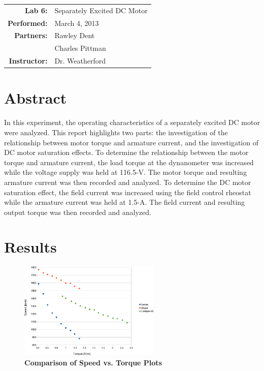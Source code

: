 \documentclass{article}
\begin{document}
\begin{tabular}{rl}
  \textbf{Lab 6:} & Separately Excited DC Motor \\
  \textbf{Performed:} & March 4, 2013 \\
  \textbf{Partners:} & Rawley Dent \\ & Charles Pittman \\
  \textbf{Instructor:} & Dr. Weatherford
\end{tabular}


\section*{Abstract}

In this experiment, the operating characteristics of a separately excited DC
motor were analyzed.  This report highlights two parts: the investigation of
the relationship between motor torque and armature current, and the
investigation of DC motor saturation effects.  To determine the relationship
between the motor torque and armature current, the load torque at the
dynanometer was increased while the voltage supply was held at 116.5-V.  The
motor torque and resulting armature current was then recorded and analyzed.  To
determine the DC motor saturation effect, the field current was increased using
the field control rheostat while the armature current was held at 1.5-A.  The
field current and resulting output torque was then recorded and analyzed.

\section*{Results}

\begin{figure}[H]
  \centering
    \includegraphics[width=0.6\textwidth]{img/graph}
    \caption{\textbf{Comparison of Speed vs. Torque Plots}}
    \label{fig:graph}
\end{figure}
\end{document}
